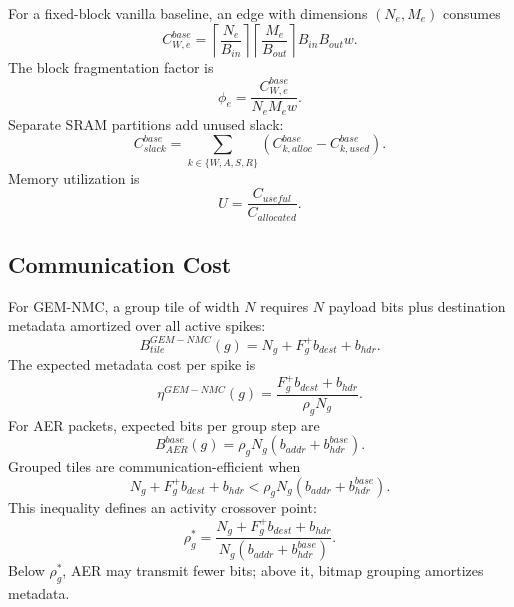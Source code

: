 \documentclass[10pt,conference]{IEEEtran}
\newcommand{\arch}{GEM-NMC}
\begin{document}
For a fixed-block vanilla baseline, an edge with dimensions $(N_e,M_e)$ consumes
\begin{equation}
    C_{W,e}^{base}=\left\lceil\frac{N_e}{B_{in}}\right\rceil\left\lceil\frac{M_e}{B_{out}}\right\rceil B_{in}B_{out}w.
\end{equation}
The block fragmentation factor is
\begin{equation}
    \phi_e = \frac{C_{W,e}^{base}}{N_eM_ew}.
\end{equation}
Separate SRAM partitions add unused slack:
\begin{equation}
    C_{slack}^{base}=\sum_{k\in\{W,A,S,R\}}(C_{k,alloc}^{base}-C_{k,used}^{base}).
\end{equation}
Memory utilization is
\begin{equation}
    U = \frac{C_{useful}}{C_{allocated}}.
\end{equation}

\subsection{Communication Cost}
For \arch{}, a group tile of width $N$ requires $N$ payload bits plus destination metadata amortized over all active spikes:
\begin{equation}
    B_{tile}^{\arch}(g)=N_g + F_g^+ b_{dest} + b_{hdr}.
\end{equation}
The expected metadata cost per spike is
\begin{equation}
    \eta^{\arch}(g)=\frac{F_g^+b_{dest}+b_{hdr}}{\rho_g N_g}.
\end{equation}
For AER packets, expected bits per group step are
\begin{equation}
    B_{AER}^{base}(g)=\rho_gN_g(b_{addr}+b_{hdr}^{base}).
\end{equation}
Grouped tiles are communication-efficient when
\begin{equation}
    N_g + F_g^+b_{dest}+b_{hdr} < \rho_gN_g(b_{addr}+b_{hdr}^{base}).
\end{equation}
This inequality defines an activity crossover point:
\begin{equation}
    \rho_g^* = \frac{N_g + F_g^+b_{dest}+b_{hdr}}{N_g(b_{addr}+b_{hdr}^{base})}.
\end{equation}
Below $\rho_g^*$, AER may transmit fewer bits; above it, bitmap grouping amortizes metadata.
\end{document}
